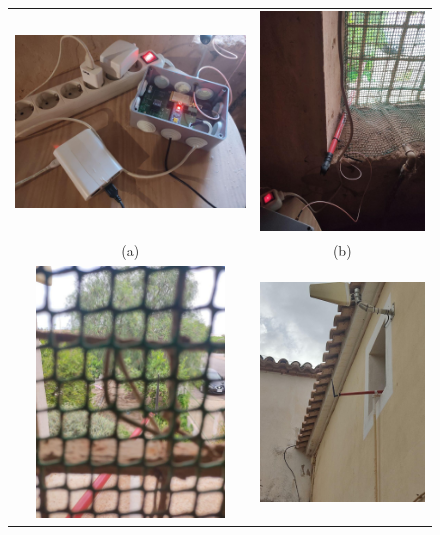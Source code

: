 \documentclass[12pt]{article}
\begin{document}
	\begin{figure}[h!]
		\begin{center}
			\begin{tabular}{cc}
				\includegraphics[width=70mm]{img/estacion_gw_interior_1.jpg} &   \includegraphics[width=50mm]{img/extensor_antena_ventana.jpg} \\
				(a)  & (b)  \\[6pt]
				\includegraphics[width=50mm]{img/extensor_antena_ventana_zoom.jpg} &   \includegraphics[width=50mm]{img/extensor_antena_ventana_exterior.jpg} \\

\end{tabular}
\end{center}
\end{figure}
\end{document}
